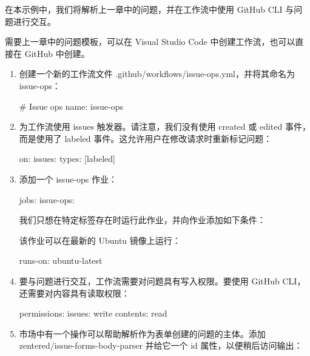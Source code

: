 
在本示例中，我们将解析上一章中的问题，并在工作流中使用 GitHub CLI 与问题进行交互。


需要上一章中的问题模板，可以在 Visual Studio Code 中创建工作流，也可以直接在 GitHub 中创建。


\begin{enumerate}
\item 
创建一个新的工作流文件 .github/workflows/issue-ops.yml，并将其命名为 issue-ops：

\begin{shell}
# Issue ops
name: issue-ops
\end{shell}

\item 
为工作流使用 issues 触发器。请注意，我们没有使用 created 或 edited 事件，而是使用了 labeled 事件。这允许用户在修改请求时重新标记问题：

\begin{shell}
on:
  issues:
    types: [labeled]
\end{shell}

\item 
添加一个 issue-ops 作业：

\begin{shell}
jobs:
  issue-ops:
\end{shell}

我们只想在特定标签存在时运行此作业，并向作业添加如下条件：


该作业可以在最新的 Ubuntu 镜像上运行：

\begin{shell}
runs-on: ubuntu-latest
\end{shell}

\item 
要与问题进行交互，工作流需要对问题具有写入权限。要使用 GitHub CLI，还需要对内容具有读取权限：

\begin{shell}
permissions:
  issues: write
  contents: read
\end{shell}

\item 
市场中有一个操作可以帮助解析作为表单创建的问题的主体。添加 zentered/issue-forms-body-parser 并给它一个 id 属性，以便稍后访问输出：


\end{enumerate}
